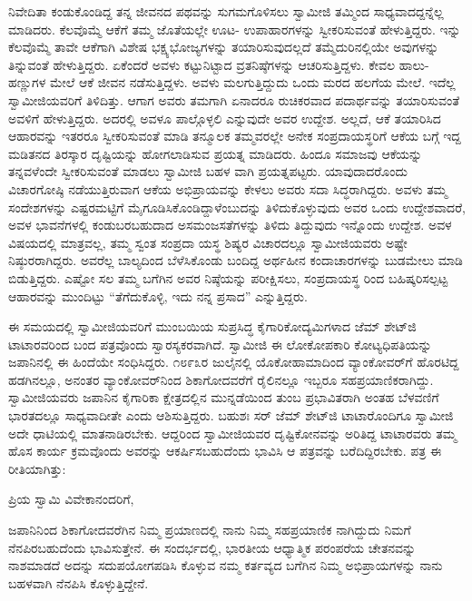 ನಿವೇದಿತಾ ಕಂಡುಕೊಂಡಿದ್ದ ತನ್ನ ಜೀವನದ ಪಥವನ್ನು ಸುಗಮಗೊಳಿಸಲು ಸ್ವಾಮೀಜಿ ತಮ್ಮಿಂದ ಸಾಧ್ಯವಾದದ್ದನ್ನೆಲ್ಲ ಮಾಡಿದರು. ಕೆಲವೊಮ್ಮೆ ಆಕೆಗೆ ತಮ್ಮ ಜೊತೆಯಲ್ಲೇ ಊಟ- ಉಪಾಹಾರಗಳನ್ನು ಸ್ವೀಕರಿಸುವಂತೆ ಹೇಳುತ್ತಿದ್ದರು. ಇನ್ನು ಕೆಲವೊಮ್ಮೆ ತಾವೇ ಆಕೆಗಾಗಿ ವಿಶೇಷ ಭಕ್ಷ್ಯಭೋಜ್ಯಗಳನ್ನು ತಯಾರಿಸುವುದಲ್ಲದೆ ತಮ್ಮೆದುರಿನಲ್ಲಿಯೇ ಅವುಗಳನ್ನು ತಿನ್ನುವಂತೆ ಹೇಳುತ್ತಿದ್ದರು. ಏಕೆಂದರೆ ಅವಳು ಕಟ್ಟುನಿಟ್ಟಾದ ವ್ರತನಿಷ್ಠೆಗಳನ್ನು ಆಚರಿಸುತ್ತಿದ್ದಳು. ಕೇವಲ ಹಾಲು-ಹಣ್ಣುಗಳ ಮೇಲೆ ಆಕೆ ಜೀವನ ನಡೆಸುತ್ತಿದ್ದಳು. ಅವಳು ಮಲಗುತ್ತಿದ್ದುದು ಒಂದು ಮರದ ಹಲಗೆಯ ಮೇಲೆ. ಇದೆಲ್ಲ ಸ್ವಾಮೀಜಿಯವರಿಗೆ ತಿಳಿದಿತ್ತು. ಆಗಾಗ ಅವರು ತಮಗಾಗಿ ಏನಾದರೂ ರುಚಿಕರವಾದ ಪದಾರ್ಥವನ್ನು ತಯಾರಿಸುವಂತೆ ಅವಳಿಗೆ ಹೇಳುತ್ತಿದ್ದರು. ಅದರಲ್ಲಿ ಅವಳೂ ಪಾಲ್ಗೊಳ್ಳಲಿ ಎನ್ನುವುದೇ ಅವರ ಉದ್ದೇಶ. ಅಲ್ಲದೆ, ಆಕೆ ತಯಾರಿಸಿದ ಆಹಾರವನ್ನು ಇತರರೂ ಸ್ವೀಕರಿಸುವಂತೆ ಮಾಡಿ ತನ್ಮೂಲಕ ತಮ್ಮವರಲ್ಲೇ ಅನೇಕ ಸಂಪ್ರದಾಯಸ್ಥರಿಗೆ ಆಕೆಯ ಬಗ್ಗೆ ಇದ್ದ ಮಡಿತನದ ತಿರಸ್ಕಾರ ದೃಷ್ಟಿಯನ್ನು ಹೋಗಲಾಡಿಸುವ ಪ್ರಯತ್ನ ಮಾಡಿದರು. ಹಿಂದೂ ಸಮಾಜವು ಆಕೆಯನ್ನು ತನ್ನವಳೆಂದೇ ಸ್ವೀಕರಿಸುವಂತೆ ಮಾಡಲು ಸ್ವಾಮೀಜಿ ಬಹಳ ವಾಗಿ ಪ್ರಯತ್ನಪಟ್ಟರು. ಯಾವುದಾದರೊಂದು ವಿಚಾರಗೋಷ್ಠಿ ನಡೆಯುತ್ತಿರುವಾಗ ಆಕೆಯ ಅಭಿಪ್ರಾಯವನ್ನು ಕೇಳಲು ಅವರು ಸದಾ ಸಿದ್ಧರಾಗಿದ್ದರು. ಅವಳು ತಮ್ಮ ಸಂದೇಶಗಳನ್ನು ಎಷ್ಟರಮಟ್ಟಿಗೆ ಮೈಗೂಡಿಸಿಕೊಂಡಿದ್ದಾಳೆಂಬುದನ್ನು ತಿಳಿದುಕೊಳ್ಳುವುದು ಅವರ ಒಂದು ಉದ್ದೇಶವಾದರೆ, ಅವಳ ಭಾವನೆಗಳಲ್ಲಿ ಕಂಡುಬರಬಹುದಾದ ಅಸಮಂಜಸತೆಗಳನ್ನು ತಿಳಿದು ತಿದ್ದುವುದು ಇನ್ನೊಂದು ಉದ್ದೇಶ. ಅವಳ ವಿಷಯದಲ್ಲಿ ಮಾತ್ರವಲ್ಲ, ತಮ್ಮ ಸ್ವಂತ ಸಂಪ್ರದಾ ಯಸ್ಥ ಶಿಷ್ಯರ ವಿಚಾರದಲ್ಲೂ ಸ್ವಾಮೀಜಿಯವರು ಅಷ್ಟೇ ನಿಷ್ಠುರರಾಗಿದ್ದರು. ಅವರೆಲ್ಲ ಬಾಲ್ಯದಿಂದ ಬೆಳೆಸಿಕೊಂಡು ಬಂದಿದ್ದ ಅರ್ಥಹೀನ ಕಂದಾಚಾರಗಳನ್ನು ಬುಡಮೇಲು ಮಾಡಿ ಬಿಡುತ್ತಿದ್ದರು. ಎಷ್ಟೋ ಸಲ ತಮ್ಮ ಬಗೆಗಿನ ಅವರ ನಿಷ್ಠೆಯನ್ನು ಪರೀಕ್ಷಿಸಲು, ಸಂಪ್ರದಾಯಸ್ಥ ರಿಂದ ಬಹಿಷ್ಕರಿಸಲ್ಪಟ್ಟ ಆಹಾರವನ್ನು ಮುಂದಿಟ್ಟು “ತೆಗೆದುಕೊಳ್ಳಿ, ಇದು ನನ್ನ ಪ್ರಸಾದ” ಎನ್ನುತ್ತಿದ್ದರು.

ಈ ಸಮಯದಲ್ಲಿ ಸ್ವಾಮೀಜಿಯವರಿಗೆ ಮುಂಬಯಿಯ ಸುಪ್ರಸಿದ್ಧ ಕೈಗಾರಿಕೋದ್ಯಮಿಗಳಾದ ಜೆಮ್ ಶೇಟ್​ಜಿ ಟಾಟಾರವರಿಂದ ಬಂದ ಪತ್ರವೊಂದು ಸ್ವಾರಸ್ಯಕರವಾಗಿದೆ. ಸ್ವಾಮೀಜಿ ಈ ಲೋಕೋಪಕಾರಿ ಕೋಟ್ಯಧಿಪತಿಯನ್ನು ಜಪಾನಿನಲ್ಲಿ ಈ ಹಿಂದೆಯೇ ಸಂಧಿಸಿದ್ದರು. ೧೮೯೩ರ ಜುಲೈನಲ್ಲಿ ಯೊಕೋಹಾಮಾದಿಂದ ವ್ಯಾಂಕೋವರ್​ಗೆ ಹೊರಟಿದ್ದ ಹಡಗಿನಲ್ಲೂ, ಅನಂತರ ವ್ಯಾಂಕೋವರ್​ನಿಂದ ಶಿಕಾಗೋದವರೆಗೆ ರೈಲಿನಲ್ಲೂ ಇಬ್ಬರೂ ಸಹಪ್ರಯಾಣಿಕರಾಗಿದ್ದು. ಸ್ವಾಮೀಜಿಯವರು ಜಪಾನಿನ ಕೈಗಾರಿಕಾ ಕ್ಷೇತ್ರದಲ್ಲಿನ ಮುನ್ನಡೆಯಿಂದ ತುಂಬ ಪ್ರಭಾವಿತರಾಗಿ ಅಂತಹ ಬೆಳವಣಿಗೆ ಭಾರತದಲ್ಲೂ ಸಾಧ್ಯವಾದೀತೇ ಎಂದು ಆಶಿಸುತ್ತಿದ್ದರು. ಬಹುಶಃ ಸರ್ ಜೆಮ್ ಶೇಟ್​ಜಿ ಟಾಟಾರೊಂದಿಗೂ ಸ್ವಾಮೀಜಿ ಅದೇ ಧಾಟಿಯಲ್ಲಿ ಮಾತನಾಡಿರಬೇಕು. ಆದ್ದರಿಂದ ಸ್ವಾಮೀಜಿಯವರ ದೃಷ್ಟಿಕೋನವನ್ನು ಅರಿತಿದ್ದ ಟಾಟಾರವರು ತಮ್ಮ ಹೊಸ ಕಾರ್ಯ ಕ್ರಮವೊಂದು ಅವರನ್ನು ಆಕರ್ಷಿಸಬಹುದೆಂದು ಭಾವಿಸಿ ಆ ಪತ್ರವನ್ನು ಬರೆದಿದ್ದಿರಬೇಕು. ಪತ್ರ ಈ ರೀತಿಯಾಗಿತ್ತು:

ಪ್ರಿಯ ಸ್ವಾಮಿ ವಿವೇಕಾನಂದರಿಗೆ,

ಜಪಾನಿನಿಂದ ಶಿಕಾಗೋದವರೆಗಿನ ನಿಮ್ಮ ಪ್ರಯಾಣದಲ್ಲಿ ನಾನು ನಿಮ್ಮ ಸಹಪ್ರಯಾಣಿಕ ನಾಗಿದ್ದುದು ನಿಮಗೆ ನೆನಪಿರಬಹುದೆಂದು ಭಾವಿಸುತ್ತೇನೆ. ಈ ಸಂದರ್ಭದಲ್ಲಿ, ಭಾರತೀಯ ಆಧ್ಯಾತ್ಮಿಕ ಪರಂಪರೆಯ ಚೇತನವನ್ನು ನಾಶಮಾಡದೆ ಅದನ್ನು ಸದುಪಯೋಗಪಡಿಸಿ ಕೊಳ್ಳುವ ನಮ್ಮ ಕರ್ತವ್ಯದ ಬಗೆಗಿನ ನಿಮ್ಮ ಅಭಿಪ್ರಾಯಗಳನ್ನು ನಾನು ಬಹಳವಾಗಿ ನೆನಪಿಸಿ ಕೊಳ್ಳುತ್ತಿದ್ದೇನೆ.

